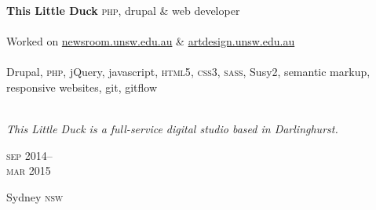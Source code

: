 
\begin{minipage}[t]{\mainboxwidth\textwidth}
\textbf{This Little Duck}\phantom{..} \textsc{php}, drupal \& web developer \\
\\
Worked on \href{https://newsroom.unsw.edu.au/}{newsroom.unsw.edu.au} 
\& \href{https://artdesign.unsw.edu.au/}{artdesign.unsw.edu.au} 
\\
\\
Drupal, \textsc{php}, jQuery, javascript, \textsc{html5}, 
\textsc{css3}, \textsc{sass}, Susy2, semantic markup, responsive websites,
git, gitflow
\\
\\
{\small
\textit{This Little Duck is a full-service digital studio based in Darlinghurst.}
\par}
\end{minipage}
\begin{minipage}[t]{\detailboxwidth\textwidth}
{
\hfill \textsc{sep} 2014--\\ 
\hspace*{0pt} \hfill \textsc{mar} 2015
\par
{\small\hfill Sydney \textsc{nsw}}
}
\end{minipage}


